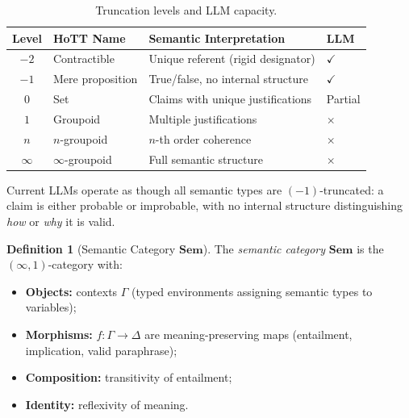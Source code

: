 \documentclass[11pt,a4paper]{article}
\theoremstyle{plain}
\theoremstyle{definition}
\newtheorem{definition}[theorem]{Definition}
\theoremstyle{remark}
\newcommand{\Sem}{\mathbf{Sem}}
\begin{document}
\begin{table}[H]
\centering
\caption{Truncation levels and LLM capacity.}
\label{tab:truncation}
\begin{tabular}{@{}clll@{}}
\toprule
\textbf{Level} & \textbf{HoTT Name} & \textbf{Semantic Interpretation} & \textbf{LLM} \\
\midrule
$-2$ & Contractible & Unique referent (rigid designator) & $\checkmark$ \\
$-1$ & Mere proposition & True/false, no internal structure & $\checkmark$ \\
$0$  & Set & Claims with unique justifications & Partial \\
$1$  & Groupoid & Multiple justifications & $\times$ \\
$n$  & $n$-groupoid & $n$-th order coherence & $\times$ \\
$\infty$ & $\infty$-groupoid & Full semantic structure & $\times$ \\
\bottomrule
\end{tabular}
\end{table}

Current LLMs operate as though all semantic types are $(-1)$-truncated: a claim is either probable or improbable, with no internal structure distinguishing \emph{how} or \emph{why} it is valid.

\begin{definition}[Semantic Category $\Sem$]
\label{def:sem}
The \emph{semantic category} $\Sem$ is the $(\infty,1)$-category with:
\begin{itemize}[nosep]
  \item \textbf{Objects:} contexts $\Gamma$ (typed environments assigning semantic types to variables);
  \item \textbf{Morphisms:} $f: \Gamma \to \Delta$ are meaning-preserving maps (entailment, implication, valid paraphrase);
  \item \textbf{Composition:} transitivity of entailment;
  \item \textbf{Identity:} reflexivity of meaning.
\end{itemize}
\end{definition}
\end{document}
